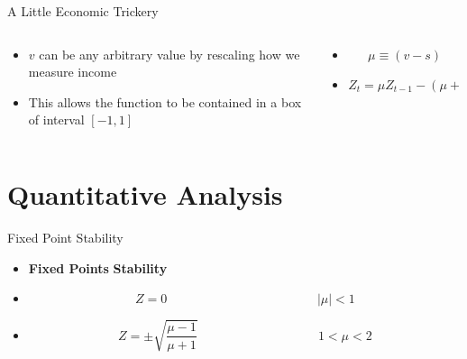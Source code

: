\documentclass{beamer}
\begin{document}
\begin{frame}{A Little Economic Trickery}
	\begin{columns}
		\begin{column}{0.5\textwidth}
			\begin{itemize}
				\item
					\(v\) can be any arbitrary value by rescaling how we measure income
				\item
					This allows the function to be contained in a box of interval \([-1,1]\)
			\end{itemize}
		\end{column}
		\begin{column}{0.5\textwidth}
			\begin{itemize}
				\item
					\begin{equation*}
						\mu\equiv(v-s)
					\end{equation*}

				\item
					\begin{equation*}
						Z_t=\mu Z_{t-1}-(\mu+1)Z^3_{t-1}
					\end{equation*}
			\end{itemize}
		\end{column}
	\end{columns}
\end{frame}

\section{Quantitative Analysis}
\begin{frame}{Fixed Point Stability}
	\begin{itemize}
		\item
			\textbf{Fixed Points}\hspace{5cm} \textbf{Stability}
		\item
			\begin{equation*}
				Z=0 \hspace{5cm} \lvert \mu \rvert<1
			\end{equation*}

		\item
			\begin{equation*}
				Z=\pm\sqrt{\frac{\mu-1}{\mu+1}} \hspace{4cm} 1<\mu<2
			\end{equation*}
	\end{itemize}
\end{frame}
\end{document}
